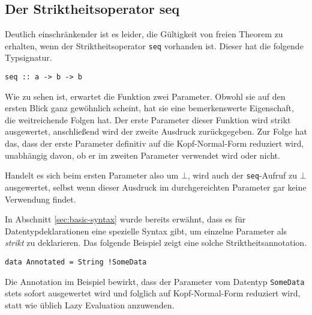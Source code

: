 \subsection{Der Striktheitsoperator seq}

Deutlich einschränkender ist es leider, die Gültigkeit von freien Theorem zu erhalten, wenn der Striktheitsoperator \texttt{seq}
vorhanden ist. Dieser hat die folgende Typsignatur.

\begin{verbatim}
seq :: a -> b -> b
\end{verbatim}

Wie zu sehen ist, erwartet die Funktion zwei Parameter. Obwohl sie auf den ersten Blick ganz gewöhnlich scheint, hat sie
eine bemerkenswerte Eigenschaft, die weitreichende Folgen hat. Der erste Parameter dieser Funktion wird strikt ausgewertet,
anschließend wird der zweite Ausdruck zurückgegeben. Zur Folge hat das, dass der erste Parameter definitiv auf die
Kopf-Normal-Form reduziert wird, unabhängig davon, ob er im zweiten Parameter verwendet wird oder nicht.

Handelt es sich beim ersten Parameter also um $\bot$, wird auch der \texttt{seq}-Aufruf zu $\bot$ ausgewertet, selbst
wenn dieser Ausdruck im durchgereichten Parameter gar keine Verwendung findet.

In Abschnitt \ref{sec:basic-syntax} wurde bereits erwähnt, dass es für Datentypdeklarationen eine spezielle
Syntax gibt, um einzelne Parameter als \textit{strikt} zu deklarieren.
Das folgende Beispiel zeigt eine solche Striktheitsannotation.

\begin{verbatim}
data Annotated = String !SomeData
\end{verbatim}

Die Annotation im Beispiel bewirkt, dass der Parameter vom Datentyp \texttt{SomeData} stets sofort ausgewertet wird und
folglich auf Kopf-Normal-Form reduziert wird, statt wie üblich Lazy Evaluation anzuwenden.

